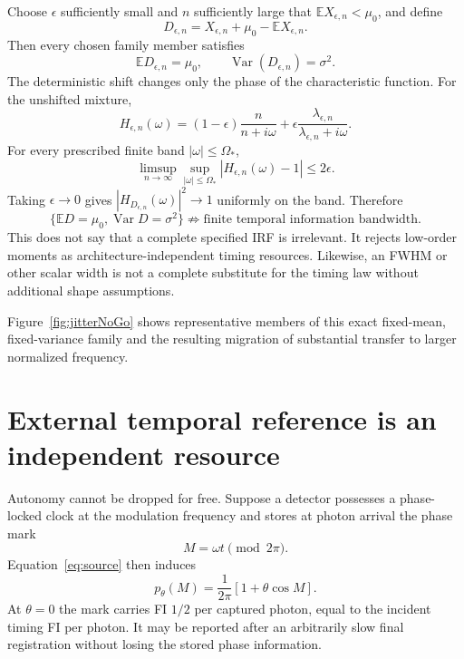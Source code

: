 \documentclass[aps,prapplied,preprint,nofootinbib]{revtex4-2}
\begin{document}
Choose $\epsilon$ sufficiently small and $n$ sufficiently large that $\mathbb E X_{\epsilon,n}<\mu_0$, and define
\begin{equation}
D_{\epsilon,n}=X_{\epsilon,n}
+\mu_0-\mathbb E X_{\epsilon,n}.
\end{equation}
Then every chosen family member satisfies
\begin{equation}
\boxed{
\mathbb E D_{\epsilon,n}=\mu_0,
\qquad
\operatorname{Var}(D_{\epsilon,n})=\sigma^2.}
\end{equation}
The deterministic shift changes only the phase of the characteristic function. For the unshifted mixture,
\begin{equation}
H_{\epsilon,n}(\omega)
=(1-\epsilon)\frac{n}{n+i\omega}
+\epsilon\frac{\lambda_{\epsilon,n}}{\lambda_{\epsilon,n}+i\omega}.
\end{equation}
For every prescribed finite band $|\omega|\le\Omega_*$,
\begin{equation}
\limsup_{n\to\infty}
\sup_{|\omega|\le\Omega_*}
|H_{\epsilon,n}(\omega)-1|
\le2\epsilon.
\end{equation}
Taking $\epsilon\to0$ gives $|H_{D_{\epsilon,n}}(\omega)|^2\to1$ uniformly on the band. Therefore
\begin{equation}
\boxed{
\{\mathbb E D=\mu_0,\operatorname{Var}D=\sigma^2\}
\not\Rightarrow
\text{finite temporal information bandwidth}.}
\end{equation}
This does not say that a complete specified IRF is irrelevant. It rejects low-order moments as architecture-independent timing resources. Likewise, an FWHM or other scalar width is not a complete substitute for the timing law without additional shape assumptions.

Figure~\ref{fig:jitterNoGo} shows representative members of this exact fixed-mean, fixed-variance family and the resulting migration of substantial transfer to larger normalized frequency.



\section{External temporal reference is an independent resource}
\label{sec:clock}

Autonomy cannot be dropped for free. Suppose a detector possesses a phase-locked clock at the modulation frequency and stores at photon arrival the phase mark
\begin{equation}
M=\omega t\pmod{2\pi}.
\end{equation}
Equation~\eqref{eq:source} then induces
\begin{equation}
p_\theta(M)=\frac{1}{2\pi}[1+\theta\cos M].
\end{equation}
At $\theta=0$ the mark carries FI $1/2$ per captured photon, equal to the incident timing FI per photon. It may be reported after an arbitrarily slow final registration without losing the stored phase information.
\end{document}
